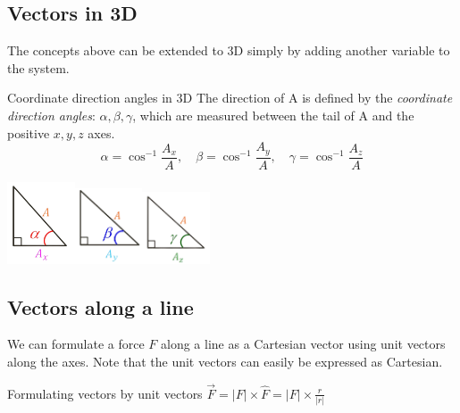 \documentclass{article}
\begin{document}
\subsection{Vectors in 3D}
The concepts above can be extended to 3D simply by adding another variable to the system.
\begin{knBox}
  {Coordinate direction angles in 3D}
  The direction of A is defined by the \emph{coordinate direction angles}: $\alpha, \beta, \gamma$, which are measured between the tail of A and the positive $x, y, z$ axes. 
  \[\alpha=\cos^{-1}\frac{A_x}{A},\quad\beta=\cos^{-1}\frac{A_y}{A},\quad\gamma=\cos^{-1}\frac{A_z}{A}\]
  \begin{center}
    \includegraphics[width=2cm]{img/Ax.png}\includegraphics[width=2cm]{img/Ay.png}\includegraphics[width=2cm]{img/Az.png}
  \end{center}
\end{knBox}

\subsection{Vectors along a line}
We can formulate a force $F$ along a line as a Cartesian vector using unit vectors along the axes. Note that the unit vectors can easily be expressed as Cartesian. 
\begin{definition}
  {Formulating vectors by unit vectors}
  $\vec{F}=|F|\times\hat{F}=|F|\times\frac{r}{|r|}$
\end{definition}
\end{document}

